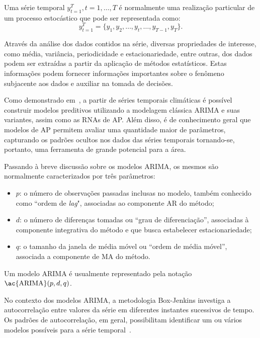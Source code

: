 \documentclass[a4paper]{ifacconf}
\begin{document}
Uma série temporal $y_{t=1}^{T}, t = 1, \ldots, T$ é normalmente uma realização particular de um processo estocástico que pode ser representada como: %
\begin{equation}\label{eq1}
	y_{t=1}^{T} =  \{y_{1}, y_{2},  \ldots,  y_{t}, \ldots, y_{T-1}, y_{T}\}.
\end{equation} %

Através da análise dos dados contidos na série, diversas propriedades de interesse, como média, variância, periodicidade e estacionariedade, entre outras, dos dados podem ser extraídas a partir da aplicação de métodos estatísticos. Estas informações podem fornecer informações importantes sobre o fenômeno subjacente aos dados e auxiliar na tomada de decisões.

Como demonstrado em~\cite{Sampaio2014,Teixeira2019,Grover2015,Mendes2017}, a partir de séries temporais climáticas é possível construir modelos preditivos utilizando a modelagem clássica \ac{ARIMA} e suas variantes, assim como as \acp{RNA} de \ac{AP}. Além disso, é de conhecimento geral que modelos de \ac{AP} permitem avaliar uma quantidade maior de parâmetros, capturando os padrões ocultos nos dados das séries temporais tornando-se, portanto, uma ferramenta de grande potencial para a área.

Passando à breve discussão sobre os modelos \ac{ARIMA}, os mesmos são normalmente caracterizados por três parâmetros: %
\begin{itemize}
	\item $p$: o número de observações passadas inclusas no modelo, também conhecido como ``ordem de \textit{lag}", associadas ao componente \ac{AR} do método;
	\item $d$: o número de diferenças tomadas ou ``grau de diferenciação'', associadas à componente integrativa do método e que busca estabelecer estacionariedade;
	\item $q$: o tamanho da janela de média móvel ou ``ordem de média móvel'', associada a componente de \ac{MA} do método.
\end{itemize} %
Um modelo \ac{ARIMA} é usualmente representado pela notação $\text{\ac{ARIMA}}(p, d, q)$.

No contexto dos modelos \ac{ARIMA}, a metodologia Box-Jenkins investiga a autocorrelação entre valores da série em diferentes instantes sucessivos de tempo. Os padrões de autocorrelação, em geral, possibilitam identificar um ou vários modelos possíveis para a série temporal~\cite{Mehdi2010}.
\end{document}
